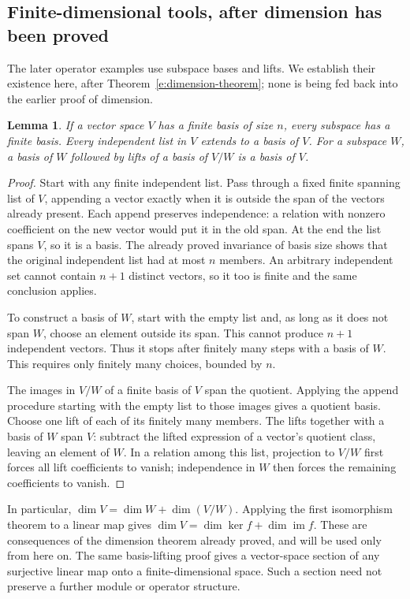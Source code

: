 \documentclass[11pt]{article}
\newtheorem{lemma}[theorem]{Lemma}
\theoremstyle{definition}
\theoremstyle{remark}\newtheorem{remark}[theorem]{Remark}
\DeclareMathOperator{\Ker}{ker}
\DeclareMathOperator{\im}{im}
\begin{document}
\subsection{Finite-dimensional tools, after dimension has been proved}
\label{m:finite-tools}

The later operator examples use subspace bases and lifts. We establish
their existence here, after Theorem~\ref{e:dimension-theorem}; none is
being fed back into the earlier proof of dimension.

\begin{lemma}\label{m:bases}
If a vector space $V$ has a finite basis of size $n$, every subspace has
a finite basis. Every independent list in $V$ extends to a basis of $V$.
For a subspace $W$, a basis of $W$ followed by lifts of a basis of $V/W$
is a basis of $V$.
\end{lemma}
\begin{proof}
Start with any finite independent list. Pass through a fixed finite
spanning list of $V$, appending a vector exactly when it is outside
the span of the vectors already present. Each append preserves
independence: a relation with nonzero coefficient on the new vector
would put it in the old span. At the end the list spans $V$, so it is
a basis. The already proved invariance of basis size shows that the
original independent list had at most $n$ members.
An arbitrary independent set cannot contain $n+1$ distinct vectors,
so it too is finite and the same conclusion applies.

To construct a basis of $W$, start with the empty list and, as long
as it does not span $W$, choose an element outside its span. This
cannot produce $n+1$ independent vectors. Thus it stops after finitely
many steps with a basis of $W$. This requires only finitely many
choices, bounded by $n$.

The images in $V/W$ of a finite basis of $V$ span the quotient.
Applying the append procedure starting with the empty list to those
images gives a quotient basis. Choose one lift of each of its finitely
many members. The lifts together with a basis of $W$ span $V$:
subtract the lifted expression of a vector's quotient class, leaving
an element of $W$. In a relation among this list, projection to $V/W$
first forces all lift coefficients to vanish; independence in $W$
then forces the remaining coefficients to vanish.
\end{proof}

In particular, $\dim V=\dim W+\dim(V/W)$. Applying the first
isomorphism theorem to a linear map gives
$\dim V=\dim\Ker f+\dim\im f$. These are consequences of the
dimension theorem already proved, and will be used only from here on.
The same basis-lifting proof gives a vector-space section of any
surjective linear map onto a finite-dimensional space. Such a section
need not preserve a further module or operator structure.
\end{document}
